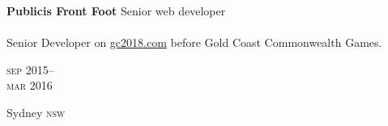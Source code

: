 \begin{minipage}[t]{\mainboxwidth\textwidth}
\textbf{Publicis Front Foot}\phantom{..} Senior web developer \\
\\
Senior Developer on \href{https://www.gc2018.com/}{gc2018.com} 
before Gold Coast Commonwealth Games.
\\
{\small
\textit{}
\par}
\end{minipage}
\begin{minipage}[t]{\detailboxwidth\textwidth}
{
\hfill \textsc{sep} 2015--\\ 
\hspace*{0pt} \hfill \textsc{mar} 2016
\par
{\small\hfill Sydney \textsc{nsw}}
}
\end{minipage}




